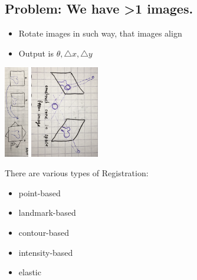 \documentclass{exerciseBlue}
\begin{document}
  \subsection{Problem: We have >1 images.}
  \begin{itemize}
  	\item Rotate images in such way, that images align
  	\item Output is $\theta, \triangle x, \triangle y$
    \end{itemize}
\begin{center}
	\includegraphics[height = 4cm]{Images/Registration1}
	\includegraphics[height = 4cm]{Images/Registration2}
\end{center}
There are various types of Registration:
\begin{itemize}
	\item point-based
	\item landmark-based
	\item contour-based
	\item intensity-based
	\item elastic
\end{itemize}
\end{document}

